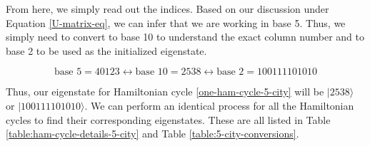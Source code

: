 \documentclass[msc,oneside]{ubcthesis}
\begin{document}
	From here, we simply read out the indices. Based on our discussion under Equation \eqref{U-matrix-eq}, we can infer that we are working in base 5. Thus, we simply need to convert to base 10 to understand the exact column number and to base 2 to be used as the initialized eigenstate.
	
	\begin{equation*}
		\text{base } 5 = 40123 \leftrightarrow \text{base } 10 = 2538 \leftrightarrow  \text{base } 2 = 100111101010
	\end{equation*}
	
	Thus, our eigenstate for Hamiltonian cycle \eqref{one-ham-cycle-5-city} will be $|2538\rangle$ or $|100111101010\rangle$. We can perform an identical process for all the Hamiltonian cycles to find their corresponding eigenstates. These are all listed in Table \ref{table:ham-cycle-details-5-city} and Table \ref{table:5-city-conversions}.
	
	
	
\end{document}
